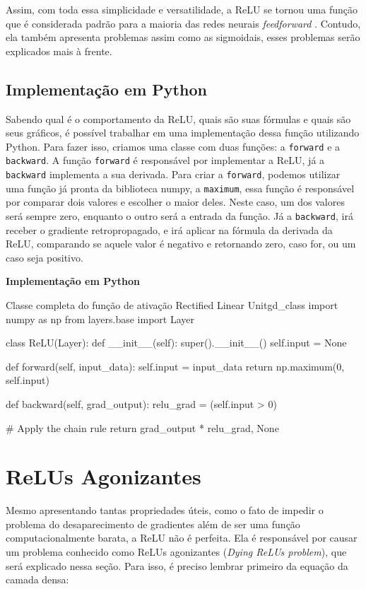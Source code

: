Assim, com toda essa simplicidade e versatilidade, a ReLU se tornou uma função que é considerada padrão para a maioria das redes neurais \textit{feedforward} \parencite{DeepLearningBook}. Contudo, ela também apresenta problemas assim como as sigmoidais, esses problemas serão explicados mais à frente.

\subsection{Implementação em Python}

Sabendo qual é o comportamento da ReLU, quais são suas fórmulas e quais são seus gráficos, é possível trabalhar em uma implementação dessa função utilizando Python. Para fazer isso, criamos uma classe com duas funções: a \texttt{forward} e a \texttt{backward}. A função \texttt{forward} é responsável por implementar a ReLU, já a \texttt{backward} implementa a sua derivada. Para criar a \texttt{forward}, podemos utilizar uma função já pronta da biblioteca numpy, a \texttt{maximum}, essa função é responsável por comparar dois valores e escolher o maior deles. Neste caso, um dos valores será sempre zero, enquanto o outro será a entrada da função. Já a \texttt{backward}, irá receber o gradiente retropropagado, e irá aplicar na fórmula da derivada da ReLU, comparando se aquele valor é negativo e retornando zero, caso for, ou um caso seja positivo.

\textbf{Implementação em Python}

\begin{codelisting}{Classe completa do função de ativação Rectified Linear Unit}{gd_class}
import numpy as np
from layers.base import Layer

class ReLU(Layer):
    def __init__(self):
        super().__init__()
        self.input = None

    def forward(self, input_data):
        self.input = input_data
        return np.maximum(0, self.input)

    def backward(self, grad_output):
        relu_grad = (self.input > 0)

        # Apply the chain rule
        return grad_output * relu_grad, None
\end{codelisting}

\section{ReLUs Agonizantes}

Mesmo apresentando tantas propriedades úteis, como o fato de impedir o problema do desaparecimento de gradientes além de ser uma função computacionalmente barata, a ReLU não é perfeita. Ela é responsável por causar um problema conhecido como ReLUs agonizantes (\textit{Dying ReLUs problem}), que será explicado nessa seção. Para isso, é preciso lembrar primeiro da equação da camada densa:

